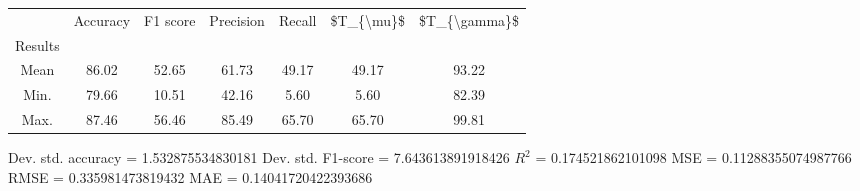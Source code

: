 \begin{tabular}{|c|c|c|c|c|c|c|}
\toprule
{} &  Accuracy &  F1 score &  Precision &  Recall &  \$T\_\{\textbackslash mu\}\$ &  \$T\_\{\textbackslash gamma\}\$ \\
Results &           &           &            &         &            &               \\
\hline
Mean    &     86.02 &     52.65 &      61.73 &   49.17 &      49.17 &         93.22 \\
Min.    &     79.66 &     10.51 &      42.16 &    5.60 &       5.60 &         82.39 \\
Max.    &     87.46 &     56.46 &      85.49 &   65.70 &      65.70 &         99.81 \\
\bottomrule
\end{tabular}

 Dev. std. accuracy = 1.532875534830181
 Dev. std. F1-score = 7.643613891918426
 $R^2$ = 0.174521862101098
 MSE = 0.11288355074987766
 RMSE = 0.335981473819432
 MAE = 0.14041720422393686